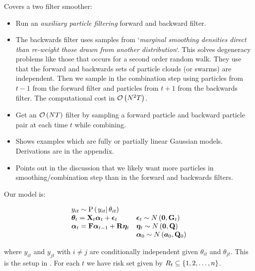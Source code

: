 \subsubsection*{\cite{fearnhead10}}
Covers a two filter smoother:
\begin{itemize}
	\item Run an \emph{auxiliary particle filtering} forward and backward filter.
	\item The backwards filter uses samples from `\textit{marginal smoothing densities direct than re-weight those drawn from another distribution}`. This solves degeneracy problems  like those that occurs for a second order random walk. They use that the forward and backwards sets of particle clouds (or swarms) are independent. Then we sample in the combination step using particles from $t-1$ from the forward filter and particles from $t + 1$ from the backwards filter. The computational cost in $\mathcal{O}\left( N^2T\right)$.
	\item Get an $\mathcal{O}\left( NT\right)$ filter by sampling a forward particle and backward particle pair at each time $t$ while combining.
	\item Shows examples which are fully or partially linear Gaussian models. Derivations are in the appendix.
	\item Points out in the discussion that we likely want more particles in smoothing/combination step than in the forward and backwards filters.
\end{itemize}



\iffalse
Our model is:

\begin{equation}
\begin{array}{ll}
 	y_{it} \sim \propC{y_{it}}{\theta_{it}} & \\
%
 	\vec{\theta}_{t} = \mat{X}_t\vec{\alpha}_t + \vec{\epsilon}_t & 
  		\vec{\epsilon}_t \sim N\Lparen{\vec{0}, \mat{G}_t} \\
% 
 	\vec{\alpha}_t = \mat{F}\vec{\alpha}_{t - 1} + \mat{R}\vec{\eta}_t &
 		\vec{\eta}_t \sim N\Lparen{\vec{0}, \mat{Q}} \\
%
	&	\vec{\alpha}_0 \sim N\Lparen{\vec{a}_0, \mat{Q}_0}
 \end{array}
\end{equation}

where $y_{it}$ and $y_{jt}$ with $i\neq j$ are conditionally independent given $\theta_{it}$ and $\theta_{jt}$. This is the setup in \cite{andrieu02}. For each $t$ we have risk set given by $R_t \subseteq \left\{ 1,2,\dots,n\right\}$.

